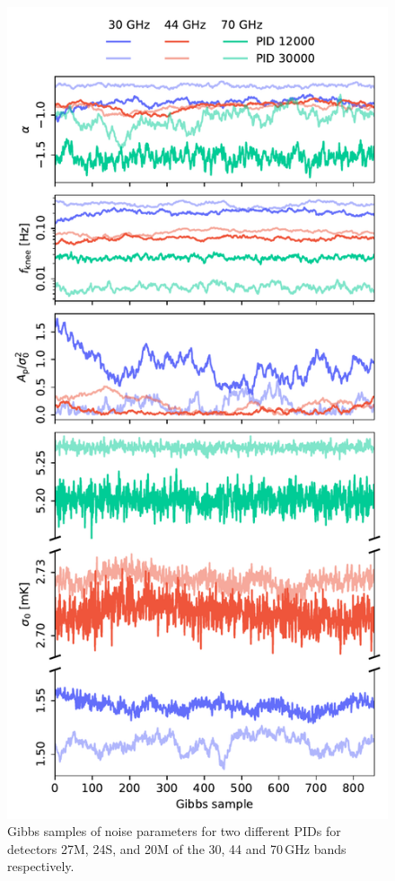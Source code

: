 \documentclass{aa}
\begin{document}
\begin{figure}
        \begin{center}
                \includegraphics[width=\linewidth]{figs/gibbs_samples_new.pdf}
        \end{center}
        \caption{Gibbs samples of noise parameters for two different PIDs for detectors 27M, 24S, and 20M of the 30, 44 and 70\,GHz bands respectively.
        \label{fig:samples}}
\end{figure}
\end{document}

